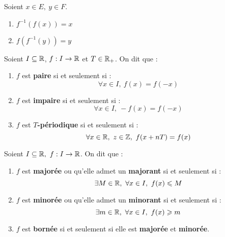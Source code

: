 \begin{proposition}
	Soient $x \in E,\ y \in F$.
    \begin{multicols}{2}
        \begin{enumerate}
            \item $f^{-1} (f(x)) = x$
            \item $f(f^{-1}(y)) = y$
        \end{enumerate}
    \end{multicols}
\end{proposition}

\begin{definition}
	Soient $I \subseteq \mathbb{R}$, $f : I \to \mathbb{R}$ et $T \in \mathbb{R}_+$. On dit que :
    \begin{enumerate}
        \item $f$ est \textbf{paire} si et seulement si : 
        \[ \forall x \in I,\ f(x) = f(-x) \]
        \item $f$ est \textbf{impaire} si et seulement si  :
        \[ \forall x \in I,\ -f(x) = f(-x) \]
        \item $f$ est \textbf{$T$-périodique} si et seulement si :
        \[ \forall x \in \mathbb{R},\ z \in \mathbb{Z},\ f(x + nT) = f(x) \]
    \end{enumerate}
\end{definition}

\begin{definition}
	Soient $I \subseteq \mathbb{R},\ f : I \to \mathbb{R}$. On dit que :
	\begin{enumerate}
	    \item $f$ est \textbf{majorée} ou qu'elle admet un \textbf{majorant} si et seulement si : 
	    \[ \exists M \in \mathbb{R},\ \forall x \in I,\ f(x) \leqslant M \]
        \item $f$ est \textbf{minorée} ou qu'elle admet un \textbf{minorant} si et seulement si :
        \[ \exists m \in \mathbb{R},\ \forall x \in I,\ f(x) \geqslant m \]
        \item $f$ est \textbf{bornée} si et seulement si elle est \textbf{majorée} et \textbf{minorée}.
	\end{enumerate}
\end{definition}

